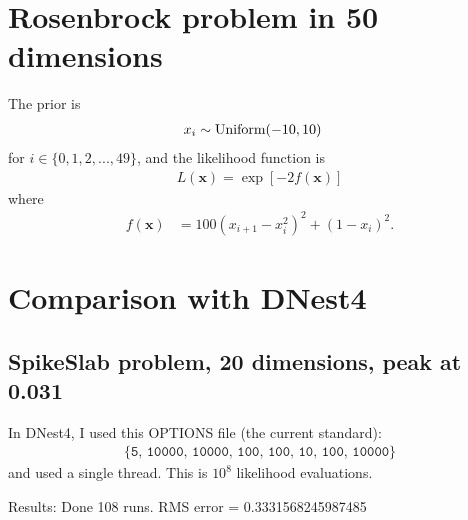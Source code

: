 \documentclass[a4paper, 12pt]{article}
\begin{document}



\section{Rosenbrock problem in 50 dimensions}

The prior is
\begin{align}
x_i &\sim \textnormal{Uniform}(-10, 10)
\end{align}
for $i \in \{0, 1, 2, ..., 49\}$,
and the likelihood function is
\begin{align}
L(\boldsymbol{x}) = \exp\left[-2f(\boldsymbol{x})\right]
\end{align}
where
\begin{align}
f(\boldsymbol{x}) &= 100(x_{i+1} - x_{i}^2)^2 + (1-x_i)^2.
\end{align}




\section{Comparison with DNest4}

\subsection{SpikeSlab problem, 20 dimensions, peak at 0.031}
In DNest4, I used this OPTIONS file (the current standard):
\begin{align}
\{\texttt{5, 10000, 10000, 100, 100, 10, 100, 10000}\}
\end{align}
and used
a single thread. This is $10^8$ likelihood evaluations.

Results:
Done 108 runs. RMS error = 0.3331568245987485
\end{document}
